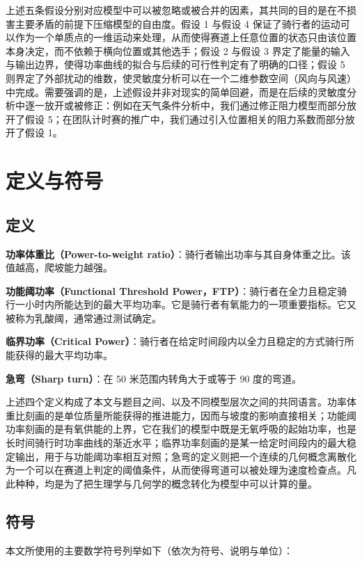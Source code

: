 \documentclass[11pt,a4paper]{ctexart}
\begin{document}
上述五条假设分别对应模型中可以被忽略或被合并的因素，其共同的目的是在不损害主要矛盾的前提下压缩模型的自由度。假设 1 与假设 4 保证了骑行者的运动可以作为一个单质点的一维运动来处理，从而使得赛道上任意位置的状态只由该位置本身决定，而不依赖于横向位置或其他选手；假设 2 与假设 3 界定了能量的输入与输出边界，使得功率曲线的拟合与后续的可行性判定有了明确的口径；假设 5 则界定了外部扰动的维数，使灵敏度分析可以在一个二维参数空间（风向与风速）中完成。需要强调的是，上述假设并非对现实的简单回避，而是在后续的灵敏度分析中逐一放开或被修正：例如在天气条件分析中，我们通过修正阻力模型而部分放开了假设 5；在团队计时赛的推广中，我们通过引入位置相关的阻力系数而部分放开了假设 1。

\section{定义与符号}

\subsection{定义}

\textbf{功率体重比（Power-to-weight ratio）}：骑行者输出功率与其自身体重之比。该值越高，爬坡能力越强。

\textbf{功能阈功率（Functional Threshold Power，FTP）}：骑行者在全力且稳定骑行一小时内所能达到的最大平均功率。它是骑行者有氧能力的一项重要指标。它又被称为乳酸阈，通常通过测试确定。

\textbf{临界功率（Critical Power）}：骑行者在给定时间段内以全力且稳定的方式骑行所能获得的最大平均功率。

\textbf{急弯（Sharp turn）}：在 50 米范围内转角大于或等于 90 度的弯道。

上述四个定义构成了本文与题目之间、以及不同模型层次之间的共同语言。功率体重比刻画的是单位质量所能获得的推进能力，因而与坡度的影响直接相关；功能阈功率刻画的是有氧供能的上界，它在我们的模型中既是无氧呼吸的起始功率，也是长时间骑行时功率曲线的渐近水平；临界功率刻画的是某一给定时间段内的最大稳定输出，用于与功能阈功率相互对照；急弯的定义则把一个连续的几何概念离散化为一个可以在赛道上判定的阈值条件，从而使得弯道可以被处理为速度检查点。凡此种种，均是为了把生理学与几何学的概念转化为模型中可以计算的量。

\subsection{符号}

本文所使用的主要数学符号列举如下（依次为符号、说明与单位）：
\end{document}
